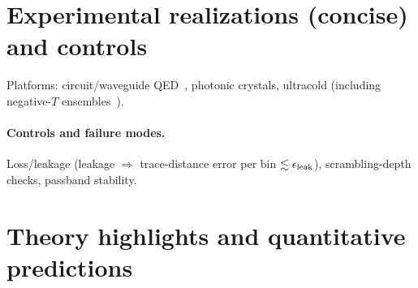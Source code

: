 \documentclass[aps,prx,onecolumn,showpacs,superscriptaddress,longbibliography,nofootinbib]{revtex4-2}
\begin{document}
\section{Experimental realizations (concise) and controls}
Platforms: circuit/waveguide QED~\cite{BlaisRMP2021,SheremetRMP2023}, photonic crystals, ultracold (including negative-$T$ ensembles~\cite{PurcellPound1951,Ramsey1956,Braun2013}).
\paragraph*{Controls and failure modes.}
Loss/leakage (leakage $\Rightarrow$ trace-distance error per bin $\lesssim \epsilon_{\rm leak}$), scrambling-depth checks, passband stability.

\section{Theory highlights and quantitative predictions}
\end{document}
